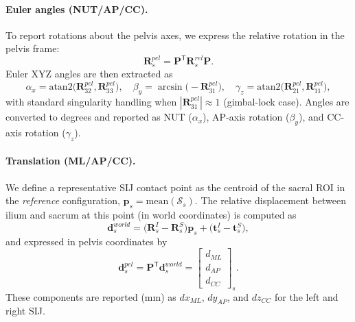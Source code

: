 \paragraph{Euler angles (NUT/AP/CC).}
To report rotations about the pelvis axes, we express the relative rotation in the pelvis frame:
\begin{equation}
\mathbf{R}^{pel}_s=\mathbf{P}^\mathsf{T}\mathbf{R}^{rel}_s\mathbf{P}.
\end{equation}
Euler XYZ angles are then extracted as
\begin{equation}
\alpha_x=\mathrm{atan2}\!\big(\mathbf{R}^{pel}_{32},\mathbf{R}^{pel}_{33}\big),
\quad
\beta_y=\arcsin\!\big(-\mathbf{R}^{pel}_{31}\big),
\quad
\gamma_z=\mathrm{atan2}\!\big(\mathbf{R}^{pel}_{21},\mathbf{R}^{pel}_{11}\big),
\end{equation}
with standard singularity handling when $|\mathbf{R}^{pel}_{31}|\approx 1$ (gimbal-lock case).
Angles are converted to degrees and reported as NUT ($\alpha_x$), AP-axis rotation ($\beta_y$), and CC-axis rotation ($\gamma_z$).

\paragraph{Translation (ML/AP/CC).}
We define a representative SIJ contact point as the centroid of the sacral ROI in the \emph{reference} configuration,
$\mathbf{p}_s=\mathrm{mean}(\mathcal{S}_s)$.
The relative displacement between ilium and sacrum at this point (in world coordinates) is computed as
\begin{equation}
\mathbf{d}^{world}_s=
\big(\mathbf{R}^{I}_s-\mathbf{R}^{S}_s\big)\mathbf{p}_s+\big(\mathbf{t}^{I}_s-\mathbf{t}^{S}_s\big),
\end{equation}
and expressed in pelvis coordinates by
\begin{equation}
\mathbf{d}^{pel}_s=\mathbf{P}^\mathsf{T}\mathbf{d}^{world}_s=
\begin{bmatrix}d_{ML}\\ d_{AP}\\ d_{CC}\end{bmatrix}_s.
\end{equation}
These components are reported (mm) as $dx_{ML}$, $dy_{AP}$, and $dz_{CC}$ for the left and right SIJ.

